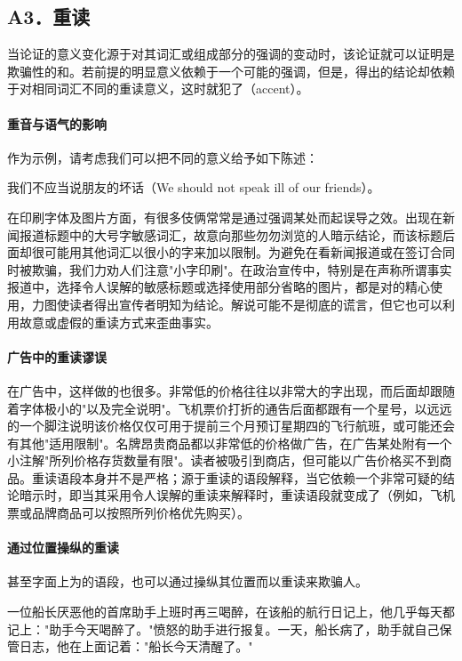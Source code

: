 \subsection{A3．重读}

\begin{theorembox}[title=重读谬误的定义]
当论证的意义变化源于对其词汇或组成部分的强调的变动时，该论证就可以证明是欺骗性的和。若前提的明显意义依赖于一个可能的强调，但是，得出的结论却依赖于对相同词汇不同的重读意义，这时就犯了（accent）。
\end{theorembox}

\paragraph{重音与语气的影响}
\begin{examplebox}[title=重音与语气的影响]
作为示例，请考虑我们可以把不同的意义给予如下陈述：

我们不应当说朋友的坏话（We should not speak ill of our friends）。

在印刷字体及图片方面，有很多伎俩常常是通过强调某处而起误导之效。出现在新闻报道标题中的大号字敏感词汇，故意向那些勿勿浏览的人暗示结论，而该标题后面却很可能用其他词汇以很小的字来加以限制。为避免在看新闻报道或在签订合同时被欺骗，我们力劝人们注意"小字印刷"。在政治宣传中，特别是在声称所谓事实报道中，选择令人误解的敏感标题或选择使用部分省略的图片，都是对的精心使用，力图使读者得出宣传者明知为结论。解说可能不是彻底的谎言，但它也可以利用故意或虚假的重读方式来歪曲事实。
\end{examplebox}

\paragraph{广告中的重读谬误}
\begin{examplebox}[title=广告中的重读谬误]
在广告中，这样做的也很多。非常低的价格往往以非常大的字出现，而后面却跟随着字体极小的"以及完全说明"。飞机票价打折的通告后面都跟有一个星号，以远远的一个脚注说明该价格仅仅可用于提前三个月预订星期四的飞行航班，或可能还会有其他"适用限制"。名牌昂贵商品都以非常低的价格做广告，在广告某处附有一个小注解"所列价格存货数量有限"。读者被吸引到商店，但可能以广告价格买不到商品。重读语段本身并不是严格；源于重读的语段解释，当它依赖一个非常可疑的结论暗示时，即当其采用令人误解的重读来解释时，重读语段就变成了（例如，飞机票或品牌商品可以按照所列价格优先购买）。
\end{examplebox}

\paragraph{通过位置操纵的重读}
\begin{examplebox}[title=通过位置操纵的重读]
甚至字面上为的语段，也可以通过操纵其位置而以重读来欺骗人。

一位船长厌恶他的首席助手上班时再三喝醉，在该船的航行日记上，他几乎每天都记上："助手今天喝醉了。"愤怒的助手进行报复。一天，船长病了，助手就自己保管日志，他在上面记着："船长今天清醒了。"
\end{examplebox}